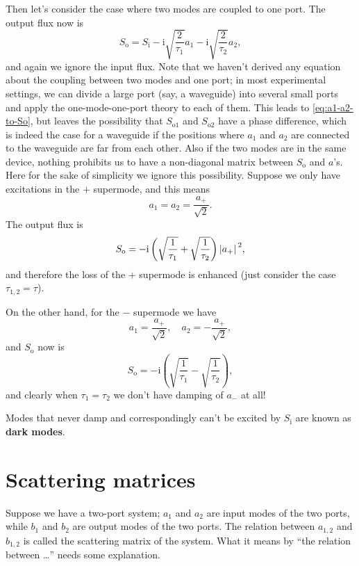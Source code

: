 \documentclass[hyperref, a4paper]{article}
\newcommand*{\ii}{\mathrm{i}}
\newcommand*{\concept}[1]{{\textbf{#1}}}
\newcommand*{\Si}{S_{\text{i}}}
\newcommand*{\So}{S_{\text{o}}}
\begin{document}
Then let's consider the case where two modes are coupled to one port.
The output flux now is 
\begin{equation}
    \So = \Si - \ii \sqrt{\frac{2}{\tau_1}} a_1 - \ii \sqrt{\frac{2}{\tau_2}} a_2,
    \label{eq:a1-a2-to-So}
\end{equation}
and again we ignore the input flux.
Note that we haven't derived any equation about the coupling between two modes and one port; 
in most experimental settings, we can divide a large port (say, a waveguide) 
into several small ports and apply the one-mode-one-port theory to each of them.
This leads to \eqref{eq:a1-a2-to-So}, but leaves the possibility that 
$S_{\text{o1}}$ and $S_{\text{o2}}$ have a phase difference, 
which is indeed the case for a waveguide 
if the positions where $a_1$ and $a_2$ are connected to the waveguide  
are far from each other.
Also if the two modes are in the same device, 
nothing prohibits us to have a non-diagonal matrix between $\So$ and $a$'s.
Here for the sake of simplicity we ignore this possibility.
Suppose we only have excitations in the $+$ supermode,
and this means 
\begin{equation}
    a_1 = a_2 = \frac{a_+}{\sqrt{2}}.
\end{equation}
The output flux is 
\begin{equation}
    \So = - \ii \left(\sqrt{\frac{1}{\tau_1}} + \sqrt{\frac{1}{\tau_2}}\right) \abs*{a_+}^2,
\end{equation}
and therefore the loss of the $+$ supermode is enhanced 
(just consider the case $\tau_{1,2} = \tau$).

On the other hand, for the $-$ supermode we have 
\begin{equation}
    a_1 = \frac{a_+}{\sqrt{2}}, \quad a_2 = - \frac{a_+}{\sqrt{2}},
\end{equation}
and $\So$ now is 
\begin{equation}
    \So = - \ii \left( \sqrt{\frac{1}{\tau_1}} - \sqrt{\frac{1}{\tau_2}} \right),
\end{equation}
and clearly when $\tau_1 = \tau_2$ we don't have damping of $a_-$ at all!

Modes that never damp and correspondingly can't be excited by $\Si$ 
are known as \concept{dark modes}.

\section{Scattering matrices}

Suppose we have a two-port system; 
$a_1$ and $a_2$ are input modes of the two ports, 
while $b_1$ and $b_2$ are output modes of the two ports.
The relation between $a_{1,2}$ and $b_{1,2}$ is called the scattering matrix of the system.
What it means by ``the relation between \dots'' needs some explanation.
\end{document}

